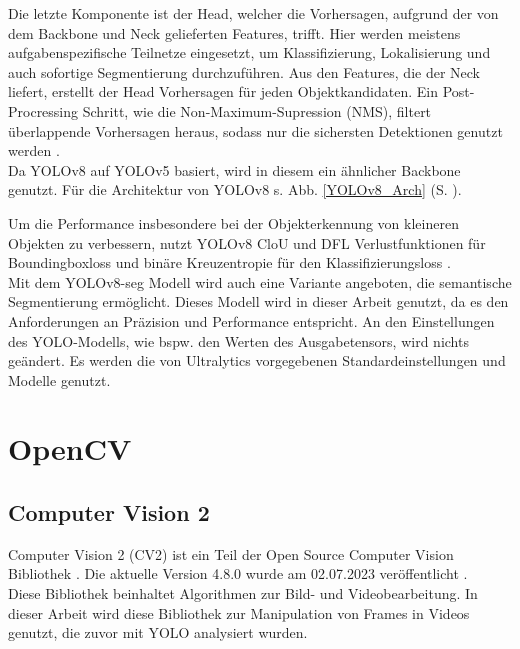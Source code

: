 {	Die letzte Komponente ist der Head, welcher die Vorhersagen, aufgrund der von dem Backbone und Neck gelieferten Features, trifft. Hier werden meistens aufgabenspezifische Teilnetze eingesetzt, um Klassifizierung, Lokalisierung und auch sofortige Segmentierung durchzuführen. Aus den Features, die der Neck liefert, erstellt der Head Vorhersagen für jeden Objektkandidaten. Ein Post-Procressing Schritt, wie die Non-Maximum-Supression (NMS), filtert überlappende Vorhersagen heraus, sodass nur die sichersten Detektionen genutzt werden \citep{Terven2023}.\\
	Da YOLOv8 auf YOLOv5 basiert, wird in diesem ein ähnlicher Backbone genutzt. Für die Architektur von YOLOv8 s. Abb. \ref{YOLOv8_Arch} (S. \pageref{YOLOv8_Arch}). 

	Um die Performance insbesondere bei der Objekterkennung von kleineren Objekten zu verbessern, nutzt YOLOv8 CloU \citep{Zheng2020} und DFL \citep{Li2020} Verlustfunktionen für Boundingboxloss und binäre Kreuzentropie für den Klassifizierungsloss \citep{Terven2023}. \\

	Mit dem YOLOv8-seg Modell wird auch eine Variante angeboten, die semantische Segmentierung ermöglicht. Dieses Modell wird in dieser Arbeit genutzt, da es den Anforderungen an Präzision und Performance entspricht. An den Einstellungen des YOLO-Modells, wie bspw. den Werten des Ausgabetensors, wird nichts geändert. Es werden die von Ultralytics vorgegebenen Standardeinstellungen und Modelle genutzt.
	}

\section{OpenCV}

\subsection{Computer Vision 2}
		{ \label{subsec:Computer_Vision_2}
		Computer Vision 2 (CV2) ist ein Teil der \glqq Open Source Computer Vision\grqq{} Bibliothek \citep{opencv_about}. Die aktuelle Version 4.8.0 wurde am 02.07.2023 veröffentlicht \citep{opencv_release}. \\
		Diese Bibliothek beinhaltet Algorithmen zur Bild- und Videobearbeitung. In dieser Arbeit wird diese Bibliothek zur Manipulation von Frames in Videos genutzt, die zuvor mit YOLO analysiert wurden. 
		}
		
